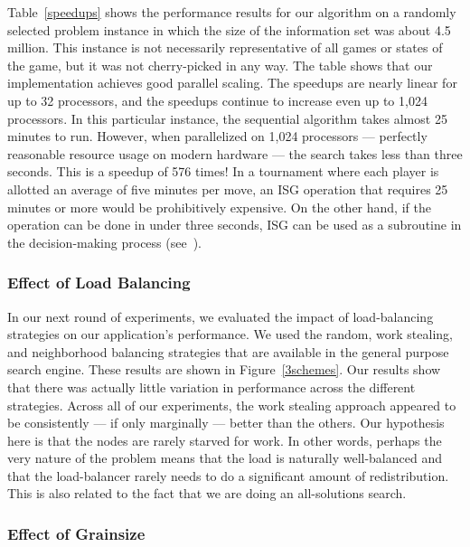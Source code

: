 \documentclass[10pt, conference, compsocconf]{IEEEtran}
\begin{document}
Table~\ref{speedups} shows the performance results for our algorithm on a
randomly selected problem instance in which the size of the information set was
about 4.5 million.  This instance is not necessarily representative of all
games or states of the game, but it was not cherry-picked in any way. The table
shows that our implementation achieves good parallel scaling. The speedups are nearly
linear for up to 32 processors, and the speedups continue to increase even up
to 1,024 processors. In this particular instance, the sequential algorithm
takes almost 25 minutes to run.  However, when parallelized on 1,024
processors --- perfectly reasonable resource usage on modern hardware --- the
search takes less than three seconds.  This is a speedup of 576 times! In a
tournament where each player is allotted an average of five minutes per move,
an ISG operation that requires 25 minutes or more would be prohibitively
expensive.  On the other hand, if the operation can be done in under three
seconds, ISG can be used as a subroutine in the decision-making process
(see~\cite{parker05game}). 



\subsubsection{Effect of Load Balancing}

In our next round of experiments, we evaluated the impact of load-balancing
strategies on our application's performance.  We used the random, work stealing, and
neighborhood balancing strategies that are available in the general purpose
search engine.  These results are shown in Figure~\ref{3schemes}.  Our results
show that there was actually little variation in performance across the
different strategies.  Across all of our experiments, the work stealing
approach appeared to be consistently --- if only marginally --- better than the
others.  Our hypothesis here is that the nodes are rarely starved for work.  In
other words, perhaps the very nature of the problem means that the load is
naturally well-balanced and that the load-balancer rarely needs to do a
significant amount of redistribution.  This is also related to the
fact that we are doing an all-solutions search. 

\subsubsection{Effect of Grainsize}
\end{document}

